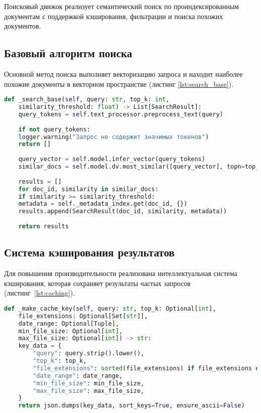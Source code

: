 Поисковый движок реализует семантический поиск по проиндексированным документам с поддержкой кэширования, фильтрации и поиска похожих документов.

\subsection{Базовый алгоритм поиска}

Основной метод поиска выполняет векторизацию запроса и находит наиболее похожие документы в векторном пространстве (листинг \ref{lst:search_base}).

\begin{lstlisting}[language=Python,caption={Базовая реализация семантического поиска},label=lst:search_base]
	def _search_base(self, query: str, top_k: int, 
	similarity_threshold: float) -> List[SearchResult]:
	query_tokens = self.text_processor.preprocess_text(query)
	
	if not query_tokens:
	logger.warning("Запрос не содержит значимых токенов")
	return []
	
	query_vector = self.model.infer_vector(query_tokens)
	similar_docs = self.model.dv.most_similar([query_vector], topn=top_k)
	
	results = []
	for doc_id, similarity in similar_docs:
	if similarity >= similarity_threshold:
	metadata = self._metadata_index.get(doc_id, {})
	results.append(SearchResult(doc_id, similarity, metadata))
	
	return results
\end{lstlisting}

\subsection{Система кэширования результатов}

Для повышения производительности реализована интеллектуальная система кэширования, которая сохраняет результаты частых запросов  (листинг~\ref{lst:caching}).
\clearpage

\begin{lstlisting}[language=Python,caption={Генерация ключа кэша для поискового запроса},label=lst:caching]
	def _make_cache_key(self, query: str, top_k: Optional[int], 
	file_extensions: Optional[Set[str]], 
	date_range: Optional[Tuple],
	min_file_size: Optional[int], 
	max_file_size: Optional[int]) -> str:
	key_data = {
		"query": query.strip().lower(),
		"top_k": top_k,
		"file_extensions": sorted(file_extensions) if file_extensions else None,
		"date_range": date_range,
		"min_file_size": min_file_size,
		"max_file_size": max_file_size,
	}
	return json.dumps(key_data, sort_keys=True, ensure_ascii=False)
\end{lstlisting}

